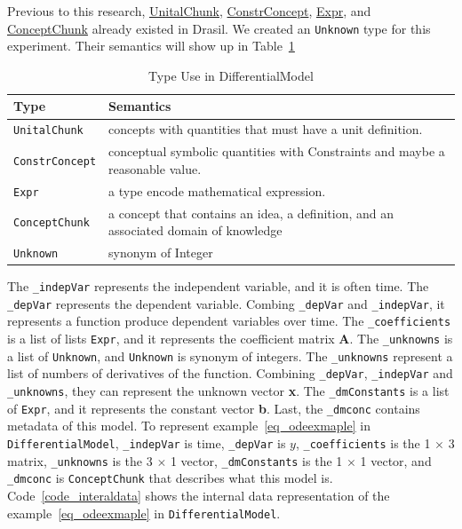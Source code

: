 Previous to this research, \href{https://jacquescarette.github.io/Drasil/docs/full/drasil-lang-0.1.60.0/Language-Drasil-Chunk-Unital.html#t:UnitalChunk}{UnitalChunk}, \href{https://jacquescarette.github.io/Drasil/docs/full/drasil-lang-0.1.60.0/Language-Drasil-Chunk-Constrained.html#t:ConstrConcept}{ConstrConcept}, \href{https://jacquescarette.github.io/Drasil/docs/full/drasil-lang-0.1.60.0/Language-Drasil-Expr-Lang.html#t:Expr}{Expr}, and \href{https://jacquescarette.github.io/Drasil/docs/full/drasil-lang-0.1.60.0/Language-Drasil-Chunk-Concept-Core.html#t:ConceptChunk}{ConceptChunk} already existed in Drasil. We created an \verb|Unknown| type for this experiment. Their semantics will show up in Table~\ref{tab_demodeltype}
\begin{table}[ht]
	\begin{tabular}{ p{} p{} }
		\textbf{Type} & \textbf{Semantics} \\
		\toprule
		\verb|UnitalChunk| & concepts with quantities that must have a unit definition.\\
		\verb|ConstrConcept| & conceptual symbolic quantities with Constraints and maybe a reasonable value.\\
		\verb|Expr| & a type encode mathematical expression. \\
		\verb|ConceptChunk| & a concept that contains an idea, a definition, and an associated domain of knowledge\\
        \verb|Unknown|& synonym of Integer\\
		\bottomrule	
	\end{tabular}	
	\caption{Type Use in DifferentialModel}	
	\label{tab_demodeltype}
\end{table}

The \verb|_indepVar| represents the independent variable, and it is often time. The \verb|_depVar| represents the dependent variable. Combing \verb|_depVar| and \verb|_indepVar|, it represents a function produce dependent variables over time. The \verb|_coefficients| is a list of lists \verb|Expr|, and it represents the coefficient matrix \textbf{A}. The \verb|_unknowns| is a list of \verb|Unknown|, and \verb|Unknown| is synonym of integers.
The \verb|_unknowns| represent a list of numbers of derivatives of the function. Combining \verb|_depVar|, \verb|_indepVar| and \verb|_unknowns|, they can represent the unknown vector \textbf{x}. The \verb|_dmConstants| is a list of \verb|Expr|, and it represents the constant vector \textbf{b}. Last, the \verb|_dmconc| contains metadata of this model. To represent example~\ref{eq_odeexmaple} in \verb|DifferentialModel|, \verb|_indepVar| is time, \verb|_depVar| is $y$, \verb|_coefficients| is the 1 $\times$ 3 matrix, \verb|_unknowns| is the 3 $\times$ 1 vector, \verb|_dmConstants| is the 1 $\times$ 1 vector, and \verb|_dmconc| is \verb|ConceptChunk| that describes what this model is. Code~\ref{code_interaldata} shows the internal data representation of the example~\ref{eq_odeexmaple} in \verb|DifferentialModel|.

